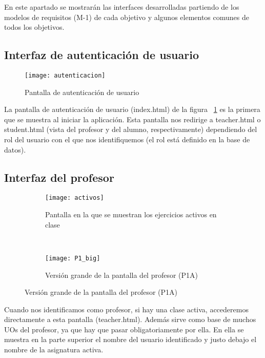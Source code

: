 En este apartado se mostrarán las interfaces desarrolladas partiendo de los modelos de requisitos (M-1) de cada objetivo y algunos elementos comunes de todos los objetivos.

\subsection{Interfaz de autenticación de usuario}
\label{diseno-e-implementacion:interfaces:autenticacion}

\begin{figure}[H]
	\centering
	\texttt{[image: autenticacion]}
	\caption{Pantalla de autenticación de usuario}
	\label{fig:autenticacion}
\end{figure}

La pantalla de autenticación de usuario (index.html) de la figura ~\ref{fig:autenticacion} es la primera que se muestra al iniciar la aplicación. Esta pantalla nos redirige a teacher.html o student.html (vista del profesor y del alumno, respectivamente) dependiendo del rol del usuario con el que nos identifiquemos (el rol está definido en la base de datos).\\

\subsection{Interfaz del profesor}
\label{diseno-e-implementacion:interfaces:profesor}

\begin{figure}[H]
\begin{subfigure}[b]{\textwidth}
	\centering
	\texttt{[image: activos]}
	\caption{Pantalla en la que se muestran los ejercicios activos en clase}
	\label{fig:activos}
\end{subfigure}
\\
\begin{subfigure}[b]{\textwidth}
	\centering
	\texttt{[image: P1\_big]}
	\caption{Versión grande de la pantalla del profesor (P1A)}
	\label{fig:activos_g}
\end{subfigure}

\label{diseno-e-implementacion:interfaces:profesor}
\end{figure}

Cuando nos identificamos como profesor, si hay una clase activa, accederemos directamente a esta pantalla (teacher.html). Además sirve como base de muchos UOs del profesor, ya que hay que pasar obligatoriamente por ella. En ella se muestra en la parte superior el nombre del usuario identificado y justo debajo el nombre de la asignatura activa.\\

